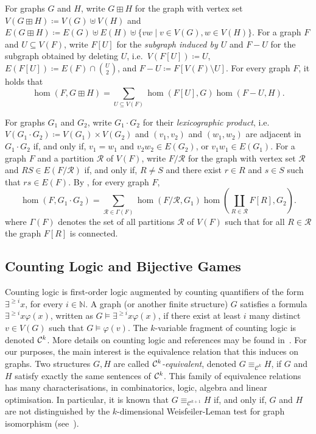\documentclass[10pt,a4paper]{article}
\theoremstyle{definition}
\theoremstyle{plain}
\theoremstyle{remark}
\newcommand{\Cc}{{\cal C}}
\renewcommand{\phi}{\varphi}
\newcommand{\bbN}{\mathbb{N}}
\begin{document}
For graphs $G$ and $H$, write $G \boxplus H$ for the graph with vertex set $V(G \boxplus H) \coloneqq V(G) \uplus V(H)$ and $E(G \boxplus H) \coloneqq E(G) \uplus E(H) \uplus \{vw \mid v \in V(G), w\in V(H)\}$.
For a graph $F$ and $U \subseteq V(F)$,
write $F[U]$ for the \emph{subgraph induced by $U$} and $F -U$ for the subgraph obtained by deleting $U$, i.e.\ $V(F[U]) \coloneqq U$, $E(F[U]) \coloneqq E(F) \cap \binom{U}{2}$, and $F-U \coloneqq F[V(F) \setminus U]$.
For every graph $F$, it holds that
\begin{equation}\label{eq:boxplus}
	\hom(F, G \boxplus H) = \sum_{U \subseteq V(F)} \hom(F[U], G) \hom(F -U, H).
\end{equation}

For graphs $G_1$ and $G_2$, write $G_1 \cdot G_2$ for their \emph{lexicographic product}, i.e.\ $V(G_1 \cdot G_2) \coloneqq V(G_1) \times V(G_2)$ and $(v_1, v_2)$ and $(w_1, w_2)$ are adjacent in $G_1 \cdot G_2$ if, and only if, $v_1 = w_1$ and $v_2w_2 \in E(G_2)$, or $v_1w_1 \in E(G_1)$.
For a graph $F$ and a partition $\mathcal{R}$ of $V(F)$,
write $F/\mathcal{R}$ for the graph with vertex set $\mathcal{R}$ and $RS \in E(F/\mathcal{R})$ if, and only if, $R \neq S$ and there exist $r \in R$ and $s \in S$ such that $rs \in E(F)$.
By \cite[Theorem~16]{seppelt_logical_2024},
for every graph $F$,
\begin{equation}\label{eq:lexprod}
	\hom(F, G_1 \cdot G_2) = \sum_{\mathcal{R} \in \Gamma(F)} \hom(F/\mathcal{R}, G_1) \hom(\coprod_{R \in \mathcal{R}} F[R], G_2).
\end{equation}	
where $\Gamma(F)$ denotes the set of all partitions $\mathcal{R}$ of $V(F)$ such that for all $R \in \mathcal{R}$ the graph $F[R]$ is connected.

\subsection{Counting Logic and Bijective Games}        


Counting logic is first-order logic
augmented by counting quantifiers of the form $\exists^{\geq i} x$,
for every $i \in \bbN$. A graph (or another finite structure) $G$
satisfies a formula $\exists^{\geq i} x \phi(x)$, written as $G
\models \exists^{\geq i} x \phi(x)$, if there exist at least $i$ many
distinct $v \in V(G)$ such that $G \models \phi(v)$. The $k$-variable
fragment of counting logic is denoted $\Cc^k$.
More details on counting logic and references may be found
in~\cite{dawar_siglog15}.  For our purposes, the main interest is the
equivalence relation that this induces on graphs.  Two structures $G,H$
are called \emph{$\Cc^k$-equivalent}, denoted $G
\equiv_{\mathcal{C}^k} H$, if $G$ and $H$ satisfy exactly the same
sentences of $\Cc^k$.  This family of equivalence relations has many
characterisations, in combinatorics, logic, algebra and linear
optimisation.  In particular, it is known that $G
\equiv_{\mathcal{C}^{k+1}} H$ if, and only if, $G$ and $H$ are not
distinguished by the $k$-dimensional Weisfeiler-Leman test for graph
isomorphism (see~\cite{CFI}).
\end{document}
